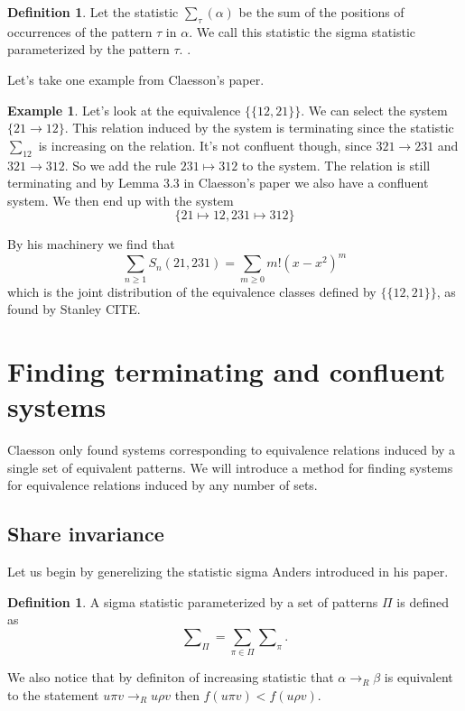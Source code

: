 \documentclass[openany, a4paper, 11pt, english]{article}
\newcommand{\patternrule}{ \mapsto \!}
\theoremstyle{definition}
\newtheorem{definition}[theorem]{Definition}
\newtheorem{example}[theorem]{Example}
\newcommand{\Sym}{S}
\begin{document}
\begin{definition}
    Let the statistic $\sum_\tau(\alpha)$ be the sum of the positions of occurrences of
    the pattern $\tau$ in $\alpha$. We call this statistic the sigma statistic
    parameterized by the pattern $\tau$.
    \cite{claesson:2021}.
\end{definition}

Let's take one example from Claesson's paper.
\begin{example}
    Let's look at the equivalence $\{ \{ 12, 21 \} \}$. We can select the system $\{
        21 \to 12 \}$. This relation induced by the system is terminating since the statistic
    $\sum_{12}$ is increasing on the relation. It's not
    confluent though, since $321 \to 231$ and $321 \to 312$. So we add the rule
    $231 \patternrule 312$ to the system. The relation is still terminating and by Lemma
    3.3 in Claesson's paper we also have a confluent system. We then end up with
    the system 
    \[
        \{ 21 \patternrule 12, 231 \patternrule 312 \}
    \]

    By his machinery we find that 
    \[
        \sum_{n \geq 1} \Sym_n(21, 231) = \sum_{m \geq 0} m!(x-x^2)^m
    \]
    which is the joint distribution of the equivalence classes defined by 
    $\{ \{ 12, 21 \} \}$, as found by Stanley CITE.
\end{example}

\section{Finding terminating and confluent systems}
Claesson only found systems corresponding to equivalence relations induced by a
single set of equivalent patterns. We will introduce a method for finding
systems for equivalence relations induced by any number of sets.

\subsection{Share invariance}
Let us begin by generelizing the statistic sigma Anders introduced in his paper.

\begin{definition}
    A sigma statistic parameterized by a set of patterns $\Pi$ is defined as
    $$
        \sum\nolimits_\Pi = \sum_{\pi \in \Pi} \sum\nolimits_{\pi}.
    $$
\end{definition}

We also notice that by definiton of increasing statistic that
$\alpha \to_R \beta$ is equivalent to the statement $u \pi v \to_R u \rho v$
then $f(u \pi v) < f(u \rho v)$.
\end{document}
